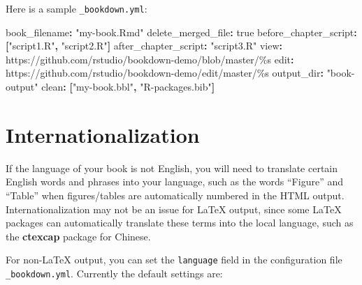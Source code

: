 \documentclass[
  12pt,
]{krantz}
\newenvironment{Shaded}{\begin{snugshade}}{\end{snugshade}}
\newcommand{\AttributeTok}[1]{\textcolor[rgb]{0.77,0.63,0.00}{#1}}
\newcommand{\CharTok}[1]{\textcolor[rgb]{0.31,0.60,0.02}{#1}}
\newcommand{\FunctionTok}[1]{\textcolor[rgb]{0.00,0.00,0.00}{#1}}
\newcommand{\KeywordTok}[1]{\textcolor[rgb]{0.13,0.29,0.53}{\textbf{#1}}}
\newcommand{\StringTok}[1]{\textcolor[rgb]{0.31,0.60,0.02}{#1}}
\theoremstyle{definition}
\theoremstyle{definition}
\theoremstyle{definition}
\theoremstyle{definition}
\theoremstyle{remark}
\begin{document}
Here is a sample \texttt{\_bookdown.yml}:

\begin{Shaded}
\begin{Highlighting}[]
\FunctionTok{book\_filename}\KeywordTok{:}\AttributeTok{ }\StringTok{"my{-}book.Rmd"}
\FunctionTok{delete\_merged\_file}\KeywordTok{:}\AttributeTok{ }\CharTok{true}
\FunctionTok{before\_chapter\_script}\KeywordTok{:}\AttributeTok{ }\KeywordTok{[}\StringTok{"script1.R"}\KeywordTok{,}\AttributeTok{ }\StringTok{"script2.R"}\KeywordTok{]}
\FunctionTok{after\_chapter\_script}\KeywordTok{:}\AttributeTok{ }\StringTok{"script3.R"}
\FunctionTok{view}\KeywordTok{:}\AttributeTok{ https://github.com/rstudio/bookdown{-}demo/blob/master/\%s}
\FunctionTok{edit}\KeywordTok{:}\AttributeTok{ https://github.com/rstudio/bookdown{-}demo/edit/master/\%s}
\FunctionTok{output\_dir}\KeywordTok{:}\AttributeTok{ }\StringTok{"book{-}output"}
\FunctionTok{clean}\KeywordTok{:}\AttributeTok{ }\KeywordTok{[}\StringTok{"my{-}book.bbl"}\KeywordTok{,}\AttributeTok{ }\StringTok{"R{-}packages.bib"}\KeywordTok{]}
\end{Highlighting}
\end{Shaded}

\hypertarget{internationalization}{%
\section{Internationalization}\label{internationalization}}

If the language of your book is not English, you will need to translate certain English words and phrases into your language, such as the words ``Figure'' and ``Table'' when figures/tables are automatically numbered in the HTML output. Internationalization may not be an issue for LaTeX output, since some LaTeX packages can automatically translate these terms into the local language, such as the \textbf{ctexcap} package for Chinese.

For non-LaTeX output, you can set the \texttt{language} field in the configuration file \texttt{\_bookdown.yml}. Currently the default settings are:
\end{document}
